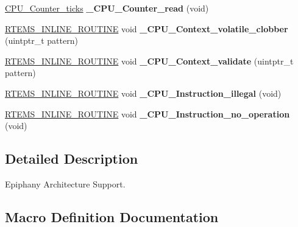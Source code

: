 \begin{DoxyCompactItemize}
\mbox{\hyperlink{no__cpu_2include_2rtems_2score_2cpu_8h_a67f8550aad58bccb6fcb4589894444ad}{C\+P\+U\+\_\+\+Counter\+\_\+ticks}} {\bfseries \+\_\+\+C\+P\+U\+\_\+\+Counter\+\_\+read} (void)
\item 
\mbox{\label{group__RTEMSScoreCPUEpiphany_gaeb1ddd8f84f82b13fad2a05a3e7d0ab7}} 
\mbox{\hyperlink{group__RTEMSScoreBaseDefs_gac216239df231d5dbd15e3520b0b9313f}{R\+T\+E\+M\+S\+\_\+\+I\+N\+L\+I\+N\+E\+\_\+\+R\+O\+U\+T\+I\+NE}} void {\bfseries \+\_\+\+C\+P\+U\+\_\+\+Context\+\_\+volatile\+\_\+clobber} (uintptr\+\_\+t pattern)
\item 
\mbox{\label{group__RTEMSScoreCPUEpiphany_gaae027d9a906bb67d38ebd7a9104b976b}} 
\mbox{\hyperlink{group__RTEMSScoreBaseDefs_gac216239df231d5dbd15e3520b0b9313f}{R\+T\+E\+M\+S\+\_\+\+I\+N\+L\+I\+N\+E\+\_\+\+R\+O\+U\+T\+I\+NE}} void {\bfseries \+\_\+\+C\+P\+U\+\_\+\+Context\+\_\+validate} (uintptr\+\_\+t pattern)
\item 
\mbox{\label{group__RTEMSScoreCPUEpiphany_ga07618c93359f2485af2e98a96b330208}} 
\mbox{\hyperlink{group__RTEMSScoreBaseDefs_gac216239df231d5dbd15e3520b0b9313f}{R\+T\+E\+M\+S\+\_\+\+I\+N\+L\+I\+N\+E\+\_\+\+R\+O\+U\+T\+I\+NE}} void {\bfseries \+\_\+\+C\+P\+U\+\_\+\+Instruction\+\_\+illegal} (void)
\item 
\mbox{\label{group__RTEMSScoreCPUEpiphany_gab683a0a37a089e2a0fd3c356836d5499}} 
\mbox{\hyperlink{group__RTEMSScoreBaseDefs_gac216239df231d5dbd15e3520b0b9313f}{R\+T\+E\+M\+S\+\_\+\+I\+N\+L\+I\+N\+E\+\_\+\+R\+O\+U\+T\+I\+NE}} void {\bfseries \+\_\+\+C\+P\+U\+\_\+\+Instruction\+\_\+no\+\_\+operation} (void)
\end{DoxyCompactItemize}


\subsection{Detailed Description}
Epiphany Architecture Support. 



\subsection{Macro Definition Documentation}
\mbox{\label{group__RTEMSScoreCPUEpiphany_ga4c07c0150ec7894dd128993e931ceee5}} 
